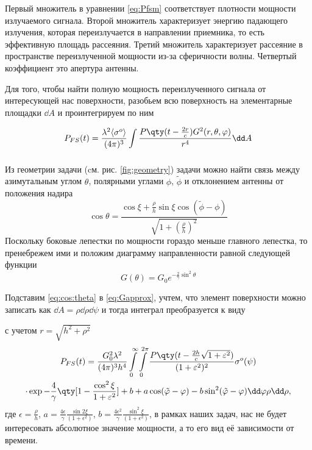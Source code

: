 Первый множитель в уравнении  \eqref{eq:Pfsm}  соответствует плотности мощности
излучаемого сигнала. Второй множитель характеризует энергию падающего
излучения, которая переизлучается в направлении приемника, то есть эффективную
площадь рассеяния. Третий множитель
характеризует рассеяние в пространстве переизлученной мощности из-за
сферичности волны. Четвертый
коэффициент это апертура антенны.


Для того, чтобы найти полную мощность переизлученного сигнала от интересующей
нас поверхности,
разобьем всю поверхность на элементарные площадки $\dd A$ и проинтегрируем
по ним 

\begin{equation}
    P_{FS}(t) = \frac{\lambda^2\mean{\sigma^o}}{(4 \pi)^3 } \int\limits_{} 
    \frac
        {P\qty(t - \frac{2r}{c}) G^2(r,\theta,\phi) }
        {r^4} 
    \dd A
\end{equation}

 Из геометрии задачи (cм. рис. \ref{fig:geometry}) задачи можно найти связь между
 азимутальным углом $\theta$, полярными углами  $\phi$,  $\tilde \phi$ и
 отклонением антенны от положения надира
 \begin{equation}
     \label{eq:cos:theta}
     \cos \theta = 
     \frac{\cos \xi + \frac{\rho}{h} \sin \xi \cos(\tilde \phi - \phi)}{\sqrt{1
     + (\frac{\rho}{h})^2}}
 \end{equation}
 Поскольку боковые лепестки по мощности гораздо меньше главного лепестка, то
 пренебрежем ими и положим диаграмму направленности   равной следующей функции
 \begin{equation}
     \label{eq:Gapprox}
     G(\theta) = G_0 e^{-\frac{2}{\gamma} \sin^2 \theta}
 \end{equation}

 Подставим \eqref{eq:cos:theta} в \eqref{eq:Gapprox}, учтем, что  элемент
 поверхности можно записать как $\dd A = \rho \dd \rho \dd \psi$ и тогда
 интеграл преобразуется к виду  

 с учетом $r = \sqrt{h^{2} + \rho^{2}}$ 
 \begin{multline}
     P_{FS}(t) = \frac{G_0^2 \lambda^2}{(4 \pi)^3 h^4}
     \int\limits_{0}^{\infty} \int\limits_{0}^{2 \pi}   
     \frac{P\qty(t - \frac{2h}{c}\sqrt{1+ \epsilon^2})}{(1+\epsilon^2)^2} \sigma^o(\psi)
     \\
     \cdot \exp{-\frac{4}{\gamma} \qty[1 - \frac{\cos^2 \xi}{1+ \epsilon^2}] + b
     + a\cos(\tilde \phi - \phi) - b \sin^2(\tilde \phi - \phi)} \dd \phi \rho
     \dd \rho,
 \end{multline}
 где 
 $\epsilon = \frac{\rho}{h}$,
 $a = \frac{4\epsilon}{\gamma} \frac{\sin 2 \xi}{(1+ \epsilon^2)}$,
 $b= \frac{4\epsilon^2}{\gamma} \frac{\sin^2 \xi}{(1+\epsilon^2)}$,
 в рамках наших задач, нас не будет интересовать абсолютное значение мощности,
 а то его вид её зависимости от времени. 

